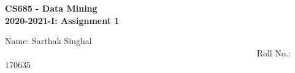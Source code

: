 \documentclass[20pt]{letter}
\begin{document}
\begin{center}
{\LARGE \textbf{
CS685 - Data Mining\\
2020-2021-I: Assignment 1
}}\end{center}

{\Large
Name: Sarthak Singhal        ~~~~~~~~~~~~~~~~~~~~~~~~~~~~~~~~~~~~~~~~~~~~~~~~~~~~~~~~~~   Roll No.: 170635\\\\}



\end{document}
